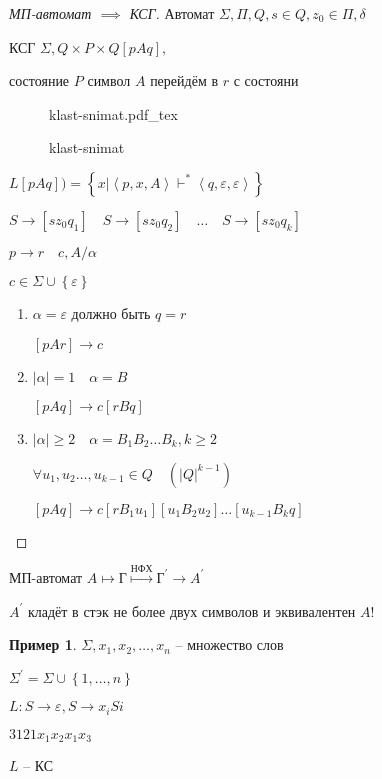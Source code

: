 \documentclass{book}
\newcommand{\p}[1]{#1^{\prime}}
\theoremstyle{definition}
\newtheorem*{example}{Пример}
\newcommand{\incfig}[1]{%
    \def\svgwidth{\columnwidth}
    {#1.pdf_tex}
}
\begin{document}
    \begin{proof}
        [МП-автомат $\implies$  КСГ]

        Автомат $\Sigma, \Pi, Q, s\in Q, z_0\in \Pi, \delta$

        КСГ $\Sigma, Q\times P\times Q [pAq], $

        состояние $P$ символ  $A$ перейдём в  $r$ с состояни

\begin{figure}[!ht]
    \centering
    \incfig{klast-snimat}
    \caption{klast-snimat}
    \label{fig:klast-snimat}
\end{figure}

$L[pAq]) = \left\{ x | \left<p, x, A \right>\vdash^* \left<q, \varepsilon, \varepsilon \right> \right\} $

$S \to  [sz_0q_1]\quad S \to  [sz_0q_2]\quad \ldots \quad S \to [sz_0q_k]$

$p\to r\quad c, A / \alpha$

$c\in \Sigma \cup \left\{ \varepsilon \right\} $

\begin{enumerate}
    \item $\alpha  = \varepsilon$ должно быть $q = r$

        $[pAr] \to c$
    \item $|\alpha| = 1\quad \alpha  = B$

        $[pAq] \to c[rBq]$
    \item $|\alpha| \geqslant 2\quad \alpha = B_1B_2\ldots B_k, k \geqslant 2$

        $\forall u_1, u_2 \ldots, u_{k-1} \in Q\quad \left( |Q|^{k-1} \right) $ 

        $[pAq] \to c[rB_1u_1][u_1B_2u_2] \ldots [u_{k-1}B_kq]$
\end{enumerate}
    \end{proof}


    МП-автомат $A \mapsto \text{Г} \overset{\text{НФХ}}{\mapsto} \text{Г}^{\prime} \to \p A$ 

    $\p A$ кладёт в стэк не более двух символов и эквивалентен  $A$!

     \begin{example}
        $\Sigma, x_1, x_2, \ldots, x_n$ -- множество слов

        $\p \Sigma  = \Sigma \cup \left\{ 1, \ldots, n \right\} $ 

        $L : S\to \varepsilon, S \to x_iS i$

        $3 1 2 1 x_1x_2x_1x_3$

        $L$ -- КС
    \end{example}
\end{document}
